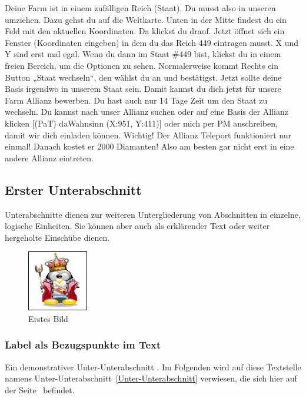 \documentclass[fontsize=12pt,a4paper,draft]{scrartcl}[2003/01/01]
\begin{document}
Deine Farm ist in einem zufälligen Reich (Staat). Du musst also in unseren umziehen. Dazu gehst du auf die Weltkarte. Unten in der Mitte findest du ein Feld mit den aktuellen Koordinaten. Da klickst du drauf. Jetzt öffnet sich ein 
Fenster (Koordinaten eingeben) in dem du das Reich 449 eintragen musst. X und Y sind erst mal egal.
Wenn du dann im Staat \#449 bist, klickst du in einem freien Bereich, um die Optionen zu sehen. Normalerweise kommt Rechts ein Button „Staat wechseln“, den wählst du an und bestätigst.
Jetzt sollte deine Basis irgendwo in unserem Staat sein. Damit kannst du dich jetzt für unsere Farm Allianz bewerben.
Du hast auch nur 14 Tage Zeit um den Staat zu wechseln.
Du kannst nach unser Allianz suchen oder auf eine Basis der Allianz klicken [(PaT) daWahnsinn (X:951, Y:411)] oder mich per PM anschreiben, damit wir dich einladen können.
Wichtig! Der Allianz Teleport funktioniert nur einmal! Danach kostet er 2000 Diamanten! Also am besten gar nicht erst in eine andere Allianz eintreten.



\subsection[Die Subsection als Unterabschnitt]{Erster Unterabschnitt}
Unterabschnitte dienen zur weiteren Untergliederung von Abschnitten in einzelne, logische Einheiten. Sie können aber auch als erklärender Text oder weiter hergeholte Einschübe dienen.

\begin{figure}
  \centering
     \includegraphics{TUX.png}
  \caption{Erstes Bild}
  \label{fig:Bild1}
\end{figure}

\subsubsection[Die Subsubsection mit Label]{Label als Bezugspunkte im Text}
Ein demonstrativer Unter-Unterabschnitt \label{Unter-Unterabschnitt}.
Im Folgenden wird auf diese Textstelle namens Unter-Unterabschnitt~\ref{Unter-Unterabschnitt} verwiesen, die sich hier auf der Seite~\pageref{Unter-Unterabschnitt} befindet.
\end{document}
